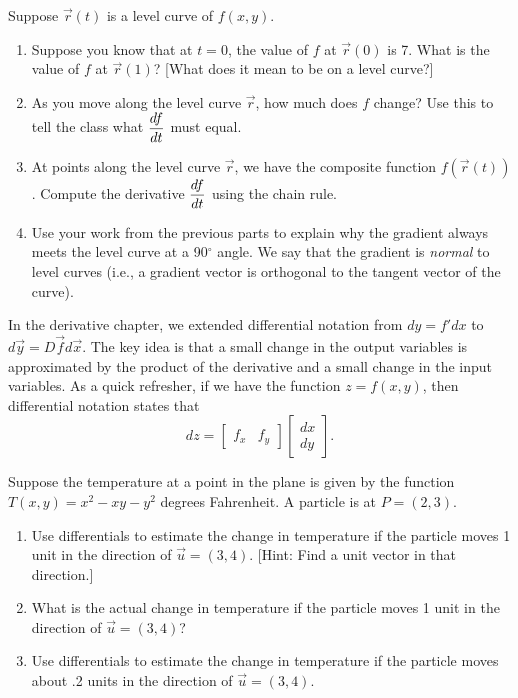 \begin{problem}
 Suppose $\vec r(t)$ is a level curve of $f(x,y)$.  
\begin{enumerate}
 \item Suppose you know that at $t=0$, the value of $f$ at $\vec r(0)$ is 7.  What is the value of $f$ at $\vec r(1)$? [What does it mean to be on a level curve?]
 \item As you move along the level curve $\vec r$, how much does $f$ change?  Use this to tell the class what $\displaystyle\frac{df}{dt}$ must equal.
 \item At points along the level curve $\vec r$, we have the composite function $f(\vec r(t))$.  Compute the derivative $\displaystyle\frac{df}{dt}$ using the chain rule.
 \item Use your work from the previous parts to explain why the gradient always meets the level curve at a 90$^\circ$ angle.  We say that the gradient is \emph{normal} to level curves (i.e., a gradient vector is orthogonal to the tangent vector of the curve).
\end{enumerate}
\end{problem}

In the derivative chapter, we extended differential notation from $dy=f' dx$ to $d\vec y = D\vec f d\vec x$. The key idea is that a small change in the output variables is approximated by the product of the derivative and a small change in the input variables. As a quick refresher, if  we have the function $z=f(x,y)$, then differential notation states that $$dz = \begin{bmatrix}f_x&f_y\end{bmatrix} \begin{bmatrix}dx\\dy\end{bmatrix}.$$ 

\begin{problem}
Suppose the temperature at a point in the plane is given by the function {$T(x,y)=x^2-xy-y^2$} degrees Fahrenheit. A particle is at $P=(2,3)$.  
\begin{enumerate}
 \item Use differentials to estimate the change in temperature if the particle moves 1 unit in the direction of $\vec u=\left(3,4\right)$. [Hint: Find a unit vector in that direction.]
 \item What is the actual change in temperature if the particle moves 1 unit in the direction of $\vec u=\left(3,4\right)$?
 \item Use differentials to estimate the change in temperature if the particle moves about .2 units in the direction of $\vec u=\left(3,4\right)$.
\end{enumerate}
\end{problem}

